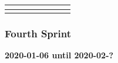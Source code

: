 \documentclass{scrartcl}
\begin{document}
\begin{table}[]
\begin{tabular}{l|l|l|l|l|l|l|l}
  \multicolumn{1}{|l|}{} &            &                          &          &                                                               &                                                                 &                                                                & \multicolumn{1}{l|}{} \\ \hline
  \multicolumn{1}{|l|}{} &            &                          &          &                                                               &                                                                 &                                                                & \multicolumn{1}{l|}{} \\ \hline
  \end{tabular}
\end{table}

\subsubsection{Fourth Sprint}
\textbf{2020-01-06 until 2020-02-?}
\end{document}
